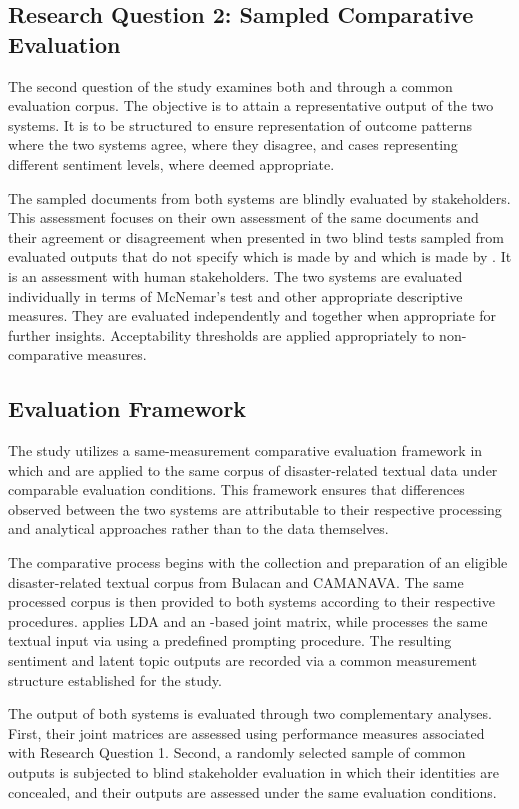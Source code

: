 \subsection*{Research Question 2: Sampled Comparative Evaluation}

The second question of the study examines both \sysA{} and \sysB{} through a
common evaluation corpus. The objective is to attain a representative output of
the two systems. It is to be structured to ensure representation of outcome
patterns where the two systems agree, where they disagree, and cases
representing different sentiment levels, where deemed appropriate.

The sampled documents from both systems are blindly evaluated by
stakeholders. This assessment focuses on their own assessment of the same
documents and their agreement or disagreement when presented in two blind tests
sampled from evaluated outputs that do not specify which is made by \sysA{} and
which is made by \sysB. It is an assessment with human stakeholders. The two systems are evaluated individually in terms of McNemar's
test and other appropriate descriptive measures. They are evaluated independently and together when appropriate for
further insights. Acceptability thresholds are applied appropriately to
non-comparative measures.

\subsection*{Evaluation Framework}

The study utilizes a same-measurement comparative evaluation framework in which
\sysA{} and \sysB{} are applied to the same corpus of disaster-related textual
data under comparable evaluation conditions. This framework ensures that differences observed between the two systems are attributable to
their respective processing and analytical approaches rather than to the data
themselves.

The comparative process begins with the collection and preparation of an
eligible disaster-related textual corpus from Bulacan and CAMANAVA. The same
processed corpus is then provided to both systems according to their
respective procedures. \sysA{} applies LDA and an \xlmr-based joint matrix,
while \sysB{} processes the same textual input via \qwen{} using a predefined
prompting procedure. The resulting sentiment and latent topic outputs are recorded
via a common measurement structure established for the study.

The output of both systems is evaluated through two complementary analyses.
First, their joint matrices are assessed
using performance measures associated with Research Question 1. Second, a randomly selected sample of common outputs is subjected to blind stakeholder
evaluation in which their identities are concealed, and their outputs are
assessed under the same evaluation conditions.

